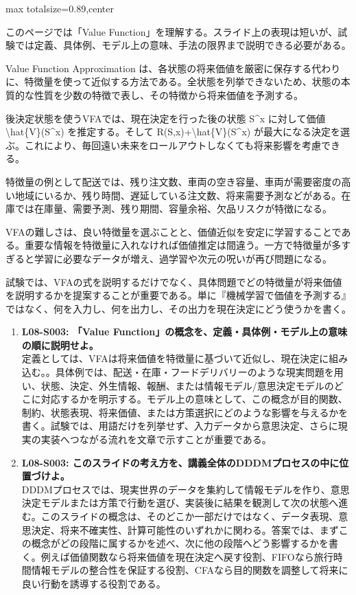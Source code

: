 \begin{minipage}[t]{0.58\textwidth}
\begin{adjustbox}{max totalsize={\textwidth}{0.89\textheight},center}
\begin{minipage}{\textwidth}\scriptsize
{}このページでは「Value Function」を理解する。スライド上の表現は短いが、試験では定義、具体例、モデル上の意味、手法の限界まで説明できる必要がある。\par
Value Function Approximation は、各状態の将来価値を厳密に保存する代わりに、特徴量を使って近似する方法である。全状態を列挙できないため、状態の本質的な性質を少数の特徴で表し、その特徴から将来価値を予測する。\par
後決定状態を使うVFAでは、現在決定を行った後の状態 S\textasciicircum{}x に対して価値 \textbackslash{}hat\{V\}(S\textasciicircum{}x) を推定する。そして R(S,x)+\textbackslash{}hat\{V\}(S\textasciicircum{}x) が最大になる決定を選ぶ。これにより、毎回遠い未来をロールアウトしなくても将来影響を考慮できる。\par
特徴量の例として配送では、残り注文数、車両の空き容量、車両が需要密度の高い地域にいるか、残り時間、遅延している注文数、将来需要予測などがある。在庫では在庫量、需要予測、残り期間、容量余裕、欠品リスクが特徴になる。\par
VFAの難しさは、良い特徴量を選ぶことと、価値近似を安定に学習することである。重要な情報を特徴量に入れなければ価値推定は間違う。一方で特徴量が多すぎると学習に必要なデータが増え、過学習や次元の呪いが再び問題になる。\par
試験では、VFAの式を説明するだけでなく、具体問題でどの特徴量が将来価値を説明するかを提案することが重要である。単に『機械学習で価値を予測する』ではなく、何を入力し、何を出力し、その出力を現在決定にどう使うかを書く。\par{}\begin{enumerate}\item \textbf{L08-S003: 「Value Function」の概念を、定義・具体例・モデル上の意味の順に説明せよ。}\\定義としては、VFAは将来価値を特徴量に基づいて近似し、現在決定に組み込む。。具体例では、配送・在庫・フードデリバリーのような現実問題を用い、状態、決定、外生情報、報酬、または情報モデル/意思決定モデルのどこに対応するかを明示する。モデル上の意味として、この概念が目的関数、制約、状態表現、将来価値、または方策選択にどのような影響を与えるかを書く。試験では、用語だけを列挙せず、入力データから意思決定、さらに現実の実装へつながる流れを文章で示すことが重要である。\item \textbf{L08-S003: このスライドの考え方を、講義全体のDDDMプロセスの中に位置づけよ。}\\DDDMプロセスでは、現実世界のデータを集約して情報モデルを作り、意思決定モデルまたは方策で行動を選び、実装後に結果を観測して次の状態へ進む。このスライドの概念は、そのどこか一部だけではなく、データ表現、意思決定、将来不確実性、計算可能性のいずれかに関わる。答案では、まずこの概念がどの段階に属するかを述べ、次に他の段階へどう影響するかを書く。例えば価値関数なら将来価値を現在決定へ戻す役割、FIFOなら旅行時間情報モデルの整合性を保証する役割、CFAなら目的関数を調整して将来に良い行動を誘導する役割である。\end{enumerate}

\end{minipage}
\end{adjustbox}
\end{minipage}

